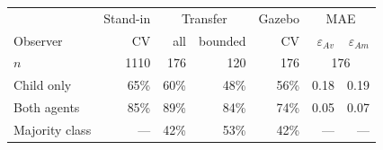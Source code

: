 \begin{tabular}{@{}lrrrrrr@{}}
\toprule
 & Stand-in & \multicolumn{2}{c}{Transfer} & Gazebo & \multicolumn{2}{c}{MAE} \\
Observer & CV & all & bounded & CV & $\varepsilon_{Av}$ & $\varepsilon_{Am}$ \\
$n$ & 1110 & 176 & 120 & 176 & \multicolumn{2}{c}{176} \\
\midrule
Child only & 65\% & 60\% & 48\% & 56\% & 0.18 & 0.19 \\
Both agents & 85\% & 89\% & 84\% & 74\% & 0.05 & 0.07 \\
Majority class & --- & 42\% & 53\% & 42\% & --- & --- \\
\bottomrule
\end{tabular}
